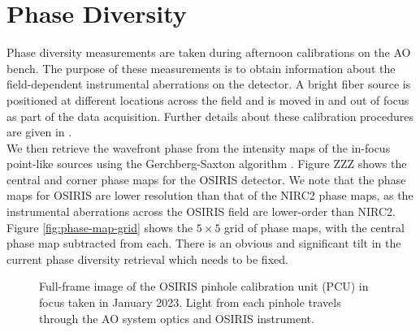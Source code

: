 \documentclass[]{spie}  %
\begin{document}
\section{Phase Diversity}\label{sec:phase-diversity}
Phase diversity measurements are taken during afternoon calibrations on the AO bench. The purpose of these measurements is to obtain information about the field-dependent instrumental aberrations on the detector. A bright fiber source is positioned at different locations across the field and is moved in and out of focus as part of the data acquisition. Further details about these calibration procedures are given in \cite{Ciurlo:inprep}. \\
\indent We then retrieve the wavefront phase from the intensity maps of the in-focus point-like sources using the Gerchberg-Saxton algorithm \cite{gerchberg:1972a}. Figure ZZZ shows the central and corner phase maps for the OSIRIS detector. We note that the phase maps for OSIRIS are lower resolution than that of the NIRC2 phase maps, as the instrumental aberrations across the OSIRIS field are lower-order than NIRC2. Figure \ref{fig:phase-map-grid} shows the $5\times5$ grid of phase maps, with the central phase map subtracted from each. There is an obvious and significant tilt in the current phase diversity retrieval which needs to be fixed.

\begin{figure}[!h]
 \caption{\footnotesize Full-frame image of the OSIRIS pinhole calibration unit (PCU) in focus taken in January 2023. Light from each pinhole travels through the AO system optics and OSIRIS instrument. \label{fig:pcu_grid_full}}
\end{figure}
\end{document}
